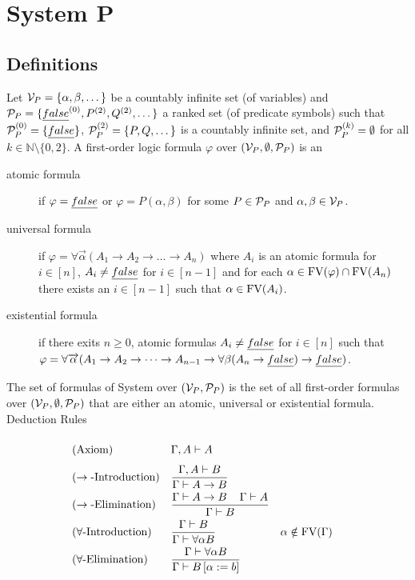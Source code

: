 \section{System P}
\subsection{Definitions}
Let $\mathcal{V}_P=\{\alpha,\beta,\dots\}$ be a countably infinite set (of variables) and $\mathcal{P}_P=\{\emph{false}^{(0)},P^{(2)},Q^{(2)},\dots\}$ a ranked set (of predicate symbols) such that $\mathcal{P}_P^{(0)}=\{\emph{false}\}$, $\mathcal{P}_P^{(2)}=\{P,Q,\dots\}$ is a countably infinite set, and $\mathcal{P}_P^{(k)}=\emptyset$ for all $k\in\mathbb{N}\setminus\{0,2\}$.
A first-order logic formula $\varphi$ over $(\mathcal{V}_P,\emptyset,\mathcal{P}_P)$ is an %
\begin{description} %
\item[atomic formula] if $\varphi=\emph{false}$ or $\varphi=P(\alpha,\beta)$ for some $P\in\mathcal{P}_P$ and $\alpha,\beta\in\mathcal{V}_P$.
\item[universal formula] if $\varphi=\forall\overrightarrow{\alpha}(A_1\to A_2 \to\dots\to A_n)$ where $A_i$ is an atomic formula for $i\in\left[n\right]$, $A_i\neq\emph{false}$ for $i\in\left[n-1\right]$ and for each $\alpha\in\text{FV}(\varphi)\cap\text{FV}(A_n)$ there exists an $i\in\left[n-1\right]$ such that $\alpha\in\text{FV}(A_i)$.
\item[existential formula] if there exits $n\ge0$,  atomic formulas $A_i\neq\emph{false}$ for $i\in\left[n\right]$ such that $\varphi=\forall\overrightarrow{\alpha}(A_1\to A_2 \to\dots\to A_{n-1}\to\forall\beta(A_n\to\emph{false})\to\emph{false})$.
\end{description}
The set of formulas of System \SysP{} over $(\mathcal{V}_P,\mathcal{P}_P)$ is the set of all first-order formulas over $(\mathcal{V}_P,\emptyset,\mathcal{P}_P)$ that are either an atomic, universal or existential formula.\\ 
Deduction Rules
\begin{mdframed}
\begingroup%
\addtolength{\jot}{0.3cm}
\begin{align*}
&(\text{Axiom}) &&\Gamma,A\vdash A\vphantom{\frac{\Gamma}{\Gamma}}\\
&(\rightarrow\text{-Introduction}) &&\frac{\Gamma,A\vdash B}{\Gamma\vdash A\to B}\\
&(\rightarrow\text{-Elimination}) &&\frac{\Gamma\vdash A\to B \hspace{0.4cm}\Gamma\vdash A}{\Gamma\vdash B}\\
&(\forall\text{-Introduction}) &&\frac{\Gamma\vdash B}{\Gamma\vdash \forall\alpha B} &&\alpha\notin\FV(\Gamma) \\
&(\forall\text{-Elimination}) &&\frac{\Gamma\vdash \forall\alpha B }{\Gamma\vdash B\left[ \alpha:=b\right] } %
\end{align*}
\endgroup
\end{mdframed}

